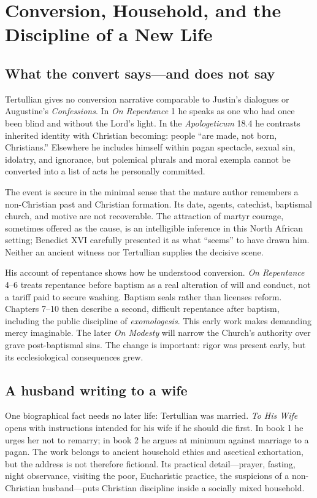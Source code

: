 \section{Conversion, Household, and the Discipline of a New Life}

\subsection{What the convert says---and does not say}

Tertullian gives no conversion narrative comparable to Justin's dialogues or
Augustine's \emph{Confessions}. In \emph{On Repentance} 1 he speaks as one who
had once been blind and without the Lord's light. In the \emph{Apologeticum}
18.4 he contrasts inherited identity with Christian becoming: people ``are
made, not born, Christians.'' Elsewhere he includes himself within pagan
spectacle, sexual sin, idolatry, and ignorance, but polemical plurals and moral
exempla cannot be converted into a list of acts he personally committed.

The event is secure in the minimal sense that the mature author remembers a
non-Christian past and Christian formation. Its date, agents, catechist,
baptismal church, and motive are not recoverable. The attraction of martyr
courage, sometimes offered as the cause, is an intelligible inference in this
North African setting; Benedict XVI carefully presented it as what ``seems'' to
have drawn him. Neither an ancient witness nor Tertullian supplies the decisive
scene.

His account of repentance shows how he understood conversion. \emph{On
Repentance} 4--6 treats repentance before baptism as a real alteration of will
and conduct, not a tariff paid to secure washing. Baptism seals rather than
licenses reform. Chapters 7--10 then describe a second, difficult repentance
after baptism, including the public discipline of \emph{exomologesis}. This
early work makes demanding mercy imaginable. The later \emph{On Modesty} will
narrow the Church's authority over grave post-baptismal sins. The change is
important: rigor was present early, but its ecclesiological consequences grew.

\subsection{A husband writing to a wife}

One biographical fact needs no later life: Tertullian was married. \emph{To His
Wife} opens with instructions intended for his wife if he should die first. In
book 1 he urges her not to remarry; in book 2 he argues at minimum against
marriage to a pagan. The work belongs to ancient household ethics and
ascetical exhortation, but the address is not therefore fictional. Its
practical detail---prayer, fasting, night observance, visiting the poor,
Eucharistic practice, the suspicions of a non-Christian husband---puts
Christian discipline inside a socially mixed household.

